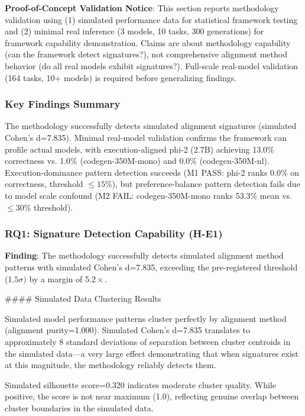 
\textbf{Proof-of-Concept Validation Notice}: This section reports methodology validation using (1) simulated performance data for statistical framework testing and (2) minimal real inference (3 models, 10 tasks, 300 generations) for framework capability demonstration. Claims are about methodology capability (can the framework detect signatures?), not comprehensive alignment method behavior (do all real models exhibit signatures?). Full-scale real-model validation (164 tasks, 10+ models) is required before generalizing findings.

\subsubsection{Key Findings Summary}

The methodology successfully detects simulated alignment signatures (simulated Cohen's d=7.835). Minimal real-model validation confirms the framework can profile actual models, with execution-aligned phi-2 (2.7B) achieving 13.0\% correctness vs. 1.0\% (codegen-350M-mono) and 0.0\% (codegen-350M-nl). Execution-dominance pattern detection succeeds (M1 PASS: phi-2 ranks 0.0\% on correctness, threshold $\leq 15$\%), but preference-balance pattern detection fails due to model scale confound (M2 FAIL: codegen-350M-mono ranks 53.3\% mean vs. $\leq 30$\% threshold).

\subsubsection{RQ1: Signature Detection Capability (H-E1)}

\textbf{Finding}: The methodology successfully detects simulated alignment method patterns with simulated Cohen's d=7.835, exceeding the pre-registered threshold (1.$5\sigma )$ by a margin of 5.$2\times$.

\#\#\#\# Simulated Data Clustering Results

Simulated model performance patterns cluster perfectly by alignment method (alignment purity=1.000). Simulated Cohen's d=7.835 translates to approximately 8 standard deviations of separation between cluster centroids in the simulated data---a very large effect demonstrating that when signatures exist at this magnitude, the methodology reliably detects them.

Simulated silhouette score=0.320 indicates moderate cluster quality. While positive, the score is not near maximum (1.0), reflecting genuine overlap between cluster boundaries in the simulated data.

